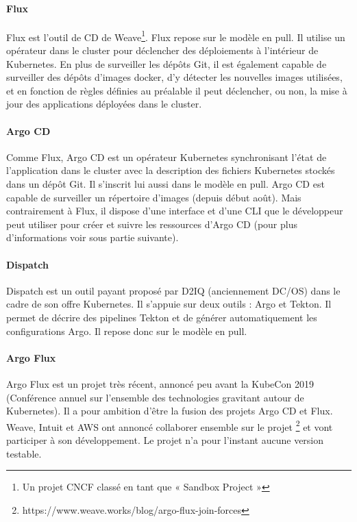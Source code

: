 \documentclass[11pt,fleqn]{book} %
\begin{document}
\paragraph{Flux}
Flux est l’outil de CD de Weave\footnote{Un projet CNCF classé en tant que « Sandbox Project »}. Flux repose sur le modèle en pull. Il utilise un opérateur dans le cluster pour déclencher des déploiements à l'intérieur de Kubernetes. En plus de surveiller les dépôts Git, il est également capable de surveiller des dépôts d'images docker, d'y détecter les nouvelles images utilisées, et en fonction de règles définies au préalable il peut déclencher, ou non, la mise à jour des applications déployées dans le cluster.

\paragraph{Argo CD}
Comme Flux, Argo CD est un opérateur Kubernetes synchronisant l'état de l'application dans le cluster avec la description des fichiers Kubernetes stockés dans un dépôt Git. Il s’inscrit lui aussi dans le modèle en pull. Argo CD est capable de surveiller un répertoire d'images (depuis début août). Mais contrairement à Flux, il dispose d'une interface et d'une CLI que le développeur peut utiliser pour créer et suivre les ressources d’Argo CD (pour plus d'informations voir sous partie suivante).

\paragraph{Dispatch}
Dispatch est un outil payant proposé par D2IQ (anciennement DC/OS) dans le cadre de son offre Kubernetes. Il s'appuie sur deux outils : Argo et Tekton. Il permet de décrire des pipelines Tekton et de générer automatiquement les configurations Argo. Il repose donc sur le modèle en pull.

\paragraph{Argo Flux}
Argo Flux est un projet très récent, annoncé peu avant la KubeCon 2019 (Conférence annuel sur l'ensemble des technologies gravitant autour de Kubernetes). Il a pour ambition d’être la fusion des projets Argo CD et Flux. Weave, Intuit et AWS ont annoncé collaborer ensemble sur le projet  \footnote{https://www.weave.works/blog/argo-flux-join-forces} et vont participer à son développement. Le projet n'a pour l'instant aucune version testable.
\end{document}
